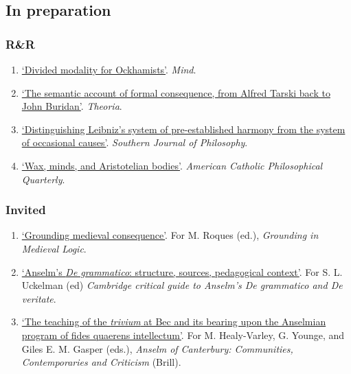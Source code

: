 \subsection{In preparation}
\subsubsection{R\&R}
\begin{enumerate}
	\setcounter{enumi}{\value{publicationCounter}}	%
	\item \datedsubsectionnarrow{}
	{}
	{
		\href{}{`Divided modality for Ockhamists'}. \emph{Mind}.}
	{}
	\item \datedsubsectionnarrow{}
{}
{
	\href{}{`The semantic account of formal consequence, from Alfred Tarski back to John Buridan'}. \emph{Theoria}.}
{}
	\item \datedsubsectionnarrow{}
{}
{
	\href{}{`Distinguishing Leibniz's system of pre-established harmony from the system of occasional causes'}. \emph{Southern Journal of Philosophy}.}
{}
	\item \datedsubsectionnarrow{}
{}
{
	\href{}{`Wax, minds, and Aristotelian bodies'}. \emph{American Catholic Philosophical Quarterly}.}
{}
	\setcounter{publicationCounter}{\value{enumi}}	%
\end{enumerate}
\subsubsection{Invited}
\begin{enumerate}
	\setcounter{enumi}{\value{publicationCounter}}	%
	\item \datedsubsectionnarrow{}
	{}
	{
		\href{}{`Grounding medieval consequence'}. For M. Roques (ed.), \emph{Grounding in Medieval Logic}.}
	{}
	\item \datedsubsectionnarrow{}
	{}
	{
		\href{}{`Anselm's \emph{De grammatico}: structure, sources, pedagogical context'}. For S. L. Uckelman (ed) \emph{Cambridge critical guide to Anselm's De grammatico and De veritate}.}
	{}
	\item \datedsubsectionnarrow{}
	{}
	{
		\href{}{`The teaching of the \emph{trivium} at Bec and its bearing upon the Anselmian program of {fides quaerens intellectum}'}. For M. Healy-Varley, G. Younge, and Giles E. M. Gasper (eds.), \emph{Anselm of Canterbury: Communities, Contemporaries and Criticism} (Brill).}
	{}
	\setcounter{publicationCounter}{\value{enumi}}	%
\end{enumerate}
